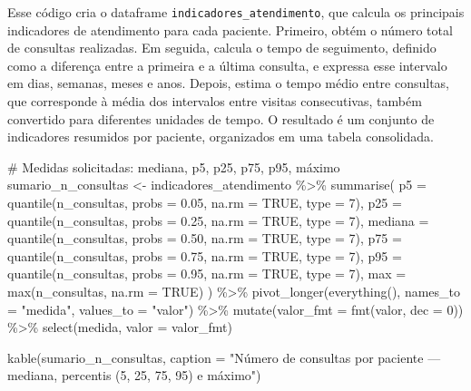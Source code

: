 \documentclass[
]{article}
\newenvironment{Shaded}{\begin{snugshade}}{\end{snugshade}}
\newcommand{\AttributeTok}[1]{\textcolor[rgb]{0.40,0.45,0.13}{#1}}
\newcommand{\CommentTok}[1]{\textcolor[rgb]{0.37,0.37,0.37}{#1}}
\newcommand{\ConstantTok}[1]{\textcolor[rgb]{0.56,0.35,0.01}{#1}}
\newcommand{\DecValTok}[1]{\textcolor[rgb]{0.68,0.00,0.00}{#1}}
\newcommand{\FloatTok}[1]{\textcolor[rgb]{0.68,0.00,0.00}{#1}}
\newcommand{\FunctionTok}[1]{\textcolor[rgb]{0.28,0.35,0.67}{#1}}
\newcommand{\NormalTok}[1]{\textcolor[rgb]{0.00,0.23,0.31}{#1}}
\newcommand{\OtherTok}[1]{\textcolor[rgb]{0.00,0.23,0.31}{#1}}
\newcommand{\SpecialCharTok}[1]{\textcolor[rgb]{0.37,0.37,0.37}{#1}}
\newcommand{\StringTok}[1]{\textcolor[rgb]{0.13,0.47,0.30}{#1}}
\begin{document}
Esse código cria o dataframe \texttt{indicadores\_atendimento}, que
calcula os principais indicadores de atendimento para cada paciente.
Primeiro, obtém o número total de consultas realizadas. Em seguida,
calcula o tempo de seguimento, definido como a diferença entre a
primeira e a última consulta, e expressa esse intervalo em dias,
semanas, meses e anos. Depois, estima o tempo médio entre consultas, que
corresponde à média dos intervalos entre visitas consecutivas, também
convertido para diferentes unidades de tempo. O resultado é um conjunto
de indicadores resumidos por paciente, organizados em uma tabela
consolidada.

\begin{Shaded}
\begin{Highlighting}[]
\CommentTok{\# Medidas solicitadas: mediana, p5, p25, p75, p95, máximo}
\NormalTok{sumario\_n\_consultas }\OtherTok{\textless{}{-}}\NormalTok{ indicadores\_atendimento }\SpecialCharTok{\%\textgreater{}\%}
  \FunctionTok{summarise}\NormalTok{(}
    \AttributeTok{p5      =} \FunctionTok{quantile}\NormalTok{(n\_consultas, }\AttributeTok{probs =} \FloatTok{0.05}\NormalTok{, }\AttributeTok{na.rm =} \ConstantTok{TRUE}\NormalTok{, }\AttributeTok{type =} \DecValTok{7}\NormalTok{),}
    \AttributeTok{p25     =} \FunctionTok{quantile}\NormalTok{(n\_consultas, }\AttributeTok{probs =} \FloatTok{0.25}\NormalTok{, }\AttributeTok{na.rm =} \ConstantTok{TRUE}\NormalTok{, }\AttributeTok{type =} \DecValTok{7}\NormalTok{),}
    \AttributeTok{mediana =} \FunctionTok{quantile}\NormalTok{(n\_consultas, }\AttributeTok{probs =} \FloatTok{0.50}\NormalTok{, }\AttributeTok{na.rm =} \ConstantTok{TRUE}\NormalTok{, }\AttributeTok{type =} \DecValTok{7}\NormalTok{),}
    \AttributeTok{p75     =} \FunctionTok{quantile}\NormalTok{(n\_consultas, }\AttributeTok{probs =} \FloatTok{0.75}\NormalTok{, }\AttributeTok{na.rm =} \ConstantTok{TRUE}\NormalTok{, }\AttributeTok{type =} \DecValTok{7}\NormalTok{),}
    \AttributeTok{p95     =} \FunctionTok{quantile}\NormalTok{(n\_consultas, }\AttributeTok{probs =} \FloatTok{0.95}\NormalTok{, }\AttributeTok{na.rm =} \ConstantTok{TRUE}\NormalTok{, }\AttributeTok{type =} \DecValTok{7}\NormalTok{),}
    \AttributeTok{max     =} \FunctionTok{max}\NormalTok{(n\_consultas, }\AttributeTok{na.rm =} \ConstantTok{TRUE}\NormalTok{)}
\NormalTok{  ) }\SpecialCharTok{\%\textgreater{}\%}
  \FunctionTok{pivot\_longer}\NormalTok{(}\FunctionTok{everything}\NormalTok{(), }\AttributeTok{names\_to =} \StringTok{"medida"}\NormalTok{, }\AttributeTok{values\_to =} \StringTok{"valor"}\NormalTok{) }\SpecialCharTok{\%\textgreater{}\%}
  \FunctionTok{mutate}\NormalTok{(}\AttributeTok{valor\_fmt =} \FunctionTok{fmt}\NormalTok{(valor, }\AttributeTok{dec =} \DecValTok{0}\NormalTok{)) }\SpecialCharTok{\%\textgreater{}\%}
  \FunctionTok{select}\NormalTok{(medida, }\AttributeTok{valor =}\NormalTok{ valor\_fmt)}

\FunctionTok{kable}\NormalTok{(sumario\_n\_consultas,}
      \AttributeTok{caption =} \StringTok{"Número de consultas por paciente — mediana, percentis (5, 25, 75, 95) e máximo"}\NormalTok{)}
\end{Highlighting}
\end{Shaded}
\end{document}

